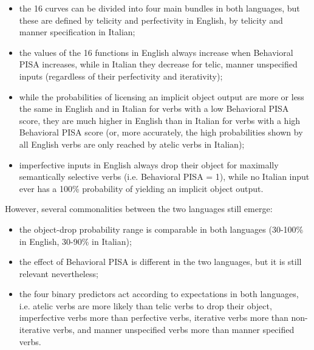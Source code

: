 \begin{itemize}
    \item the 16 curves can be divided into four main bundles in both languages, but these are defined by telicity and perfectivity in English, by telicity and manner specification in Italian;
    \item the values of the 16 functions in English always increase when Behavioral PISA increases, while in Italian they decrease for telic, manner unspecified inputs (regardless of their perfectivity and iterativity);
    \item while the probabilities of licensing an implicit object output are more or less the same in English and in Italian for verbs with a low Behavioral PISA score, they are much higher in English than in Italian for verbs with a high Behavioral PISA score (or, more accurately, the high probabilities shown by all English verbs are only reached by atelic verbs in Italian);
    \item imperfective inputs in English always drop their object for maximally semantically selective verbs (i.e. Behavioral PISA = 1), while no Italian input ever has a 100\% probability of yielding an implicit object output.
\end{itemize}

However, several commonalities between the two languages still emerge:
\begin{itemize}
    \item the object-drop probability range is comparable in both languages (30-100\% in English, 30-90\% in Italian);
    \item the effect of Behavioral PISA is different in the two languages, but it is still relevant nevertheless;
    \item the four binary predictors act according to expectations in both languages, i.e. atelic verbs are more likely than telic verbs to drop their object, imperfective verbs more than perfective verbs, iterative verbs more than non-iterative verbs, and manner unspecified verbs more than manner specified verbs.
\end{itemize}

